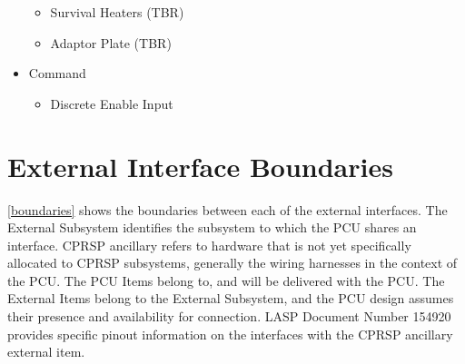 \documentclass[12pt,oneside,oldfontcommands]{memoir}
\begin{document}
\begin{itemize}
\begin{itemize}
\item{} Survival Heaters (TBR\label{tbx_2})

\item{} Adaptor Plate (TBR\label{tbx_3})

\end{itemize}

\item{} Command

\begin{itemize}
\item{} Discrete Enable Input

\end{itemize}

\end{itemize}

\section{External Interface Boundaries}
\label{externalinterfaceboundaries}

\autoref{boundaries} shows the boundaries between each of the external interfaces. The External Subsystem identifies the subsystem to which the \gls{PCU} shares an interface. \gls{CPRSP} ancillary refers to hardware that is not yet specifically allocated to \gls{CPRSP} subsystems, generally the wiring harnesses in the context of the \gls{PCU}. The \gls{PCU} Items belong to, and will be delivered with the \gls{PCU}. The External Items belong to the External Subsystem, and the \gls{PCU} design assumes their presence and availability for connection. \gls{LASP} Document Number 154920 provides specific pinout information on the interfaces with the \gls{CPRSP} ancillary external item.
\end{document}
